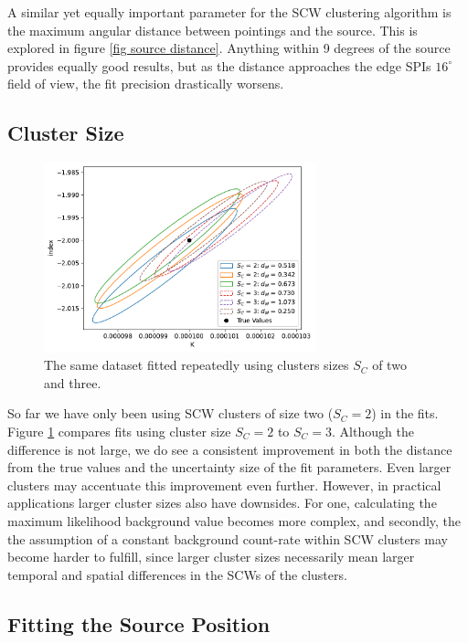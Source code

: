 \documentclass{report}
\begin{document}
A similar yet equally important parameter for the SCW clustering algorithm is the maximum angular distance between pointings and the source. This is explored in figure \ref{fig source distance}. Anything within 9 degrees of the source provides equally good results, but as the distance approaches the edge SPIs $16^\circ$ field of view, the fit precision drastically worsens. 


\subsection{Cluster Size}

\begin{figure}[h]
  \centering
  \includegraphics[width=0.7\textwidth]{Images/Pure_Simulation/combined_plots_cluster_size.pdf}
  \caption{The same dataset fitted repeatedly using clusters sizes $S_C$ of two and three.}
  \label{fig cluster size}
\end{figure}

So far we have only been using SCW clusters of size two ($S_C=2$) in the fits. Figure \ref{fig cluster size} compares fits using cluster size $S_C=2$ to $S_C=3$. Although the difference is not large, we do see a consistent improvement in both the distance from the true values and the uncertainty size of the fit parameters. Even larger clusters may accentuate this improvement even further. However, in practical applications larger cluster sizes also have downsides. For one, calculating the maximum likelihood background value becomes more complex, and secondly, the the assumption of a constant background count-rate within SCW clusters may become harder to fulfill, since larger cluster sizes necessarily mean larger temporal and spatial differences in the SCWs of the clusters.

\subsection{Fitting the Source Position}
\end{document}
